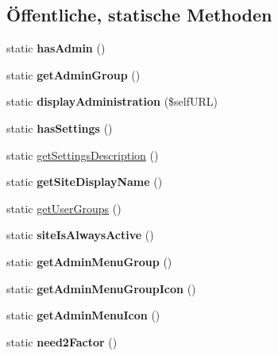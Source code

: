 \subsection*{Öffentliche, statische Methoden}
\begin{DoxyCompactItemize}
\item 
\mbox{\label{classadministrationcreateusers_ab51553578d227401bf1ba3ff6db2ecd5}} 
static {\bfseries has\+Admin} ()
\item 
\mbox{\label{classadministrationcreateusers_a4961b54fa27320e817150b7c5aa16f4c}} 
static {\bfseries get\+Admin\+Group} ()
\item 
\mbox{\label{classadministrationcreateusers_a76d28189245eeec609b01870c3242f6f}} 
static {\bfseries display\+Administration} (\$self\+U\+RL)
\item 
\mbox{\label{classadministrationcreateusers_a0a03f155149510b7456add4c580eae96}} 
static {\bfseries has\+Settings} ()
\item 
static \mbox{\hyperlink{classadministrationcreateusers_a15fb29227d0451164940e8b1cb082d8c}{get\+Settings\+Description}} ()
\item 
\mbox{\label{classadministrationcreateusers_a92d114e5fe97558bc2f7d018a1e33188}} 
static {\bfseries get\+Site\+Display\+Name} ()
\item 
static \mbox{\hyperlink{classadministrationcreateusers_a440b583f0374d93e61998e5c7031bf80}{get\+User\+Groups}} ()
\item 
\mbox{\label{classadministrationcreateusers_ad306dafd3e551b809380e7ba2822695c}} 
static {\bfseries site\+Is\+Always\+Active} ()
\item 
\mbox{\label{classadministrationcreateusers_a39ee3d906fa2a1eb7bed75dcf6d65a82}} 
static {\bfseries get\+Admin\+Menu\+Group} ()
\item 
\mbox{\label{classadministrationcreateusers_a3421d518c1f672abe74edc04b0e595b8}} 
static {\bfseries get\+Admin\+Menu\+Group\+Icon} ()
\item 
\mbox{\label{classadministrationcreateusers_a87d50942dc6f2cc4b28e000929dee7a2}} 
static {\bfseries get\+Admin\+Menu\+Icon} ()
\item 
\mbox{\label{classadministrationcreateusers_a64af4edfa016a2a7393784219f077134}} 
static {\bfseries need2\+Factor} ()
\end{DoxyCompactItemize}
